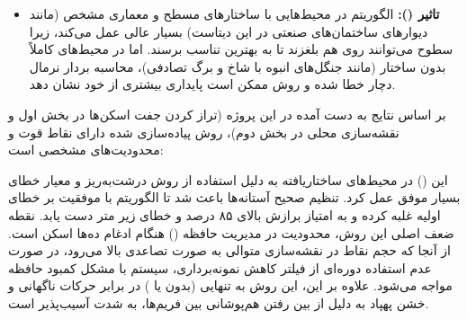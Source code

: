\documentclass[12pt,a4paper]{article}
\begin{document}
\begin{itemize}
	\item \textbf{تاثیر  ():}
	الگوریتم  در محیط‌هایی با ساختارهای مسطح و معماری مشخص (مانند دیوارهای ساختمان‌های صنعتی در این دیتاست) بسیار عالی عمل می‌کند، زیرا سطوح می‌توانند روی هم بلغزند تا به بهترین تناسب برسند. اما در محیط‌های کاملاً بدون ساختار (مانند جنگل‌های انبوه با شاخ و برگ تصادفی)، محاسبه بردار نرمال دچار خطا شده و روش  ممکن است پایداری بیشتری از خود نشان دهد.
\end{itemize}

بر اساس نتایج به دست آمده در این پروژه (تراز کردن جفت اسکن‌ها در بخش اول و نقشه‌سازی محلی در بخش دوم)، روش پیاده‌سازی شده دارای نقاط قوت و محدودیت‌های مشخصی است:

این () در محیط‌های ساختاریافته به دلیل استفاده از روش درشت‌به‌ریز و معیار خطای  بسیار موفق عمل کرد. تنظیم صحیح آستانه‌ها باعث شد تا الگوریتم با موفقیت بر خطای اولیه غلبه کرده و به امتیاز برازش بالای ۸۵ درصد و خطای زیر متر دست یابد.
نقطه ضعف اصلی این روش، محدودیت در مدیریت حافظه () هنگام ادغام ده‌ها اسکن است. از آنجا که حجم نقاط در نقشه‌سازی متوالی به صورت تصاعدی بالا می‌رود، در صورت عدم استفاده دوره‌ای از فیلتر کاهش نمونه‌برداری، سیستم با مشکل کمبود حافظه مواجه می‌شود. علاوه بر این، این روش به تنهایی (بدون  یا ) در برابر حرکات ناگهانی و خشن پهپاد به دلیل از بین رفتن هم‌پوشانی بین فریم‌ها، به شدت آسیب‌پذیر است.
\end{document}
